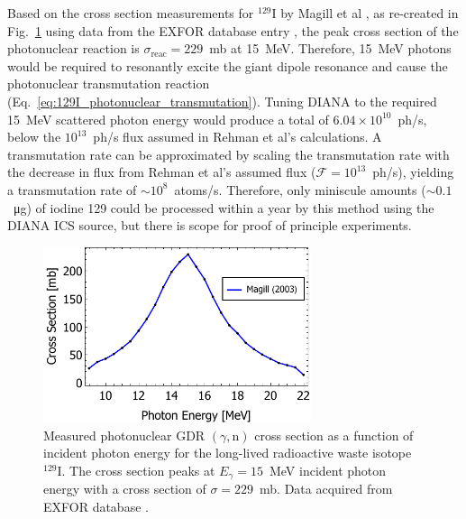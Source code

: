 \documentclass[../main.tex]{subfiles}
\begin{document}
Based on the cross section measurements for $^{129}\mathrm{I}$ by Magill et al \cite{magill2003laser}, as re-created in Fig.~\ref{fig:I129_cross_section_photon_energy} using data from the EXFOR database entry \cite{zerkin2018experimental}, the peak cross section of the photonuclear reaction is $\sigma_{\mathrm{reac}} = 229$~\si{\milli\barn} at 15~\si{\mega\electronvolt}. Therefore, 15~\si{\mega\electronvolt} photons would be required to resonantly excite the giant dipole resonance and cause the photonuclear transmutation reaction (Eq.~\ref{eq:129I_photonuclear_transmutation}). Tuning DIANA to the required 15~\si{\mega\electronvolt} scattered photon energy would produce a total of $6.04\times 10^{10}$~ph/\si{\second}, below the $10^{13}$~ph/\si{\second} flux assumed in Rehman et al's \cite{ur2017optimization} calculations. A transmutation rate can be approximated by scaling the transmutation rate with the decrease in flux from Rehman et al's assumed flux ($\mathcal{F}=10^{13}$~ph/\si{\second}), yielding a transmutation rate of $\sim10^{8}$~atoms/\si{\second}. Therefore, only miniscule amounts ($\sim0.1$~\si{\micro\gram}) of iodine 129 could be processed within a year by this method using the DIANA ICS source, but there is scope for proof of principle experiments.
\begin{figure}[!h]
\centering
\includegraphics[width=0.7\textwidth]{Figures/DIANA_Inverse_Compton_Source_Design/Iodine_129_cs_photon_energy.pdf}
\caption{Measured \cite{magill2003laser} photonuclear GDR $\left(\gamma,\mathrm{n}\right)$ cross section as a function of incident photon energy for the long-lived radioactive waste isotope $^{129}\mathrm{I}$. The cross section peaks at $E_{\gamma} = 15$~\si{\mega\electronvolt} incident photon energy with a cross section of $\sigma = 229$~\si{\milli\barn}. Data acquired from EXFOR database \cite{zerkin2018experimental}.}
\label{fig:I129_cross_section_photon_energy}
\end{figure}
\end{document}
